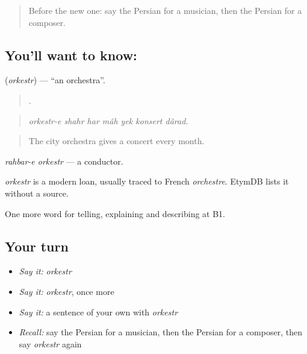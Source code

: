 \label{lesson:FA-C520-orkestr}



\begin{quote}
Before the new one: say the Persian for a musician, then the Persian for a composer.
\end{quote}

\subsection*{You'll want to know: }
\textbf{} (\emph{orkestr}) — \textquotedblleft{}an orchestra\textquotedblright{}.

\begin{quote}
      .
\end{quote}

\begin{quote}
\emph{orkestr-e shahr har mâh yek konsert dârad.}
\end{quote}

\begin{quote}
The city orchestra gives a concert every month.
\end{quote}

\emph{rahbar-e orkestr} — a conductor.

\begin{cousinweb}
\emph{orkestr} is a modern loan, usually traced to French \emph{orchestre}. EtymDB lists it without a source.
\end{cousinweb}

\begin{grammarlens}[title={What you've built}]
One more word for telling, explaining and describing at B1.
\end{grammarlens}

\subsection*{Your turn}
\begin{itemize}
\raggedright
  \item \emph{Say it:} \emph{orkestr}
  \item \emph{Say it:} \emph{orkestr}, once more
  \item \emph{Say it:} a sentence of your own with \emph{orkestr}
  \item \emph{Recall:} say the Persian for a musician, then the Persian for a composer, then say \emph{orkestr} again
\end{itemize}

